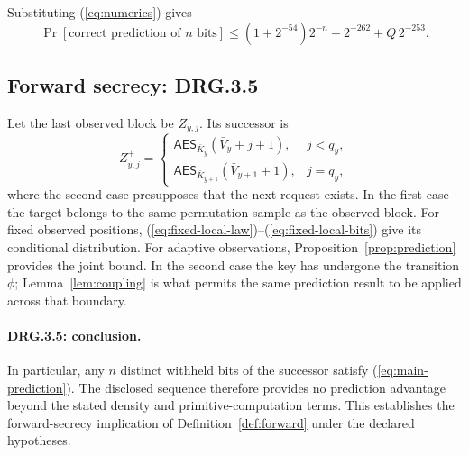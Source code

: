 \documentclass[journal=tosc,preprint,floatrow,nohyperxmp]{iacrtrans}
\newif\ifjordireview
\newcounter{jordinote}
\newcommand{\jordinote}[2]{%
  \ifjordireview
  \stepcounter{jordinote}\par\medskip\noindent
  \fcolorbox{blue!55!black}{blue!4}{%
    \begin{minipage}{\dimexpr\linewidth-2\fboxsep-2\fboxrule\relax}
    \small\raggedright\color{blue!45!black}
    \textbf{Solo Jordi -- J\thejordinote: #1}\par\smallskip
    #2
    \end{minipage}}\par\medskip
  \fi
}
\numberwithin{lemma}{section}
\numberwithin{proposition}{section}
\newcommand{\Enc}{\mathsf{AES}}
\numberwithin{equation}{section}
\theoremstyle{definition}
\numberwithin{definition}{section}
\theoremstyle{plain}
\begin{document}
Substituting (\ref{eq:numerics}) gives
\begin{equation}
 \Pr[\text{correct prediction of }n\text{ bits}]
 \le(1+2^{-54})2^{-n}+2^{-262}+Q\,2^{-253}.
 \label{eq:main-prediction}
\end{equation}

\jordinote{La pieza central y su uso en AIS}{La proposición es la pieza que conecta el cálculo con .5, .6 y la parte clásica de .7. Su prueba compara distribuciones conjuntas, incluyendo la revelación terminal, y añade una sola pérdida de acoplamiento. Revisa que los controles solo utilicen información divulgada: si una aplicación codifica el objetivo oculto en una entrada pública posterior, ella misma lo ha filtrado y se sale del experimento.}
\subsection{Forward secrecy: DRG.3.5}\label{sec:secrecy}
Let the last observed block be $Z_{y,j}$. Its successor is
\begin{equation}
 Z^+_{y,j}=\begin{cases}
 \Enc_{\bar K_y}(\bar V_y+j+1),&j<q_y,\\
 \Enc_{\bar K_{y+1}}(\bar V_{y+1}+1),&j=q_y,
 \end{cases}\label{eq:successor-cases}
\end{equation}
where the second case presupposes that the next request exists. In the first case the target belongs to the same permutation sample as the observed block. For fixed observed positions, (\ref{eq:fixed-local-law})--(\ref{eq:fixed-local-bits}) give its conditional distribution. For adaptive observations, Proposition~\ref{prop:prediction} provides the joint bound. In the second case the key has undergone the transition $\phi$; Lemma~\ref{lem:coupling} is what permits the same prediction result to be applied across that boundary.

\paragraph{DRG.3.5: conclusion.}
In particular, any $n$ distinct withheld bits of the successor satisfy (\ref{eq:main-prediction}). The disclosed sequence therefore provides no prediction advantage beyond the stated density and primitive-computation terms. This establishes the forward-secrecy implication of Definition~\ref{def:forward} under the declared hypotheses.

\end{document}
